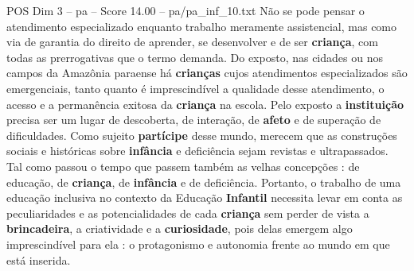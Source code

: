 \begin{textsample}{POS Dim 3 – pa – Score 14.00 – pa/pa\_inf\_10.txt}
Não se pode pensar o atendimento especializado enquanto trabalho meramente assistencial, mas como via de garantia do direito de aprender, se desenvolver e de ser \textbf{criança}, com todas as prerrogativas que o termo demanda.
Do exposto, nas cidades ou nos campos da Amazônia paraense há \textbf{crianças} cujos atendimentos especializados são emergenciais, tanto quanto é imprescindível a qualidade desse atendimento, o acesso e a permanência exitosa da \textbf{criança} na escola.
Pelo exposto a \textbf{instituição} precisa ser um lugar de descoberta, de interação, de \textbf{afeto} e de superação de dificuldades.
Como sujeito \textbf{partícipe} desse mundo, merecem que as construções sociais e históricas sobre \textbf{infância} e deficiência sejam revistas e ultrapassados.
Tal como passou o tempo que passem também as velhas concepções : de educação, de \textbf{criança}, de \textbf{infância} e de deficiência.
Portanto, o trabalho de uma educação inclusiva no contexto da Educação \textbf{Infantil} necessita levar em conta as peculiaridades e as potencialidades de cada \textbf{criança} sem perder de vista a \textbf{brincadeira}, a criatividade e a \textbf{curiosidade}, pois delas emergem algo imprescindível para ela : o protagonismo e autonomia frente ao mundo em que está inserida.

\end{textsample}
